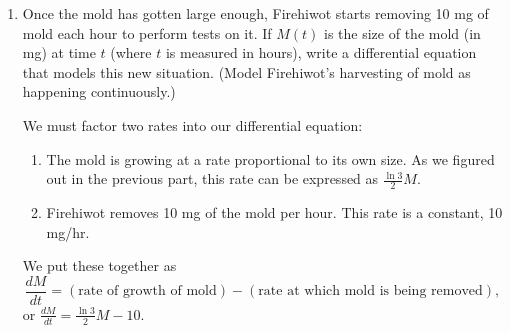\documentclass{article}
\begin{document}
\begin{enumerate}
\begin{enumerate}
\begin{enumerate}
      \begin{solution}
        Since the mold naturally grows at a rate proportional to its own
        size, we know that $\frac{dM}{dt} = kM$.  However, we are told
        that our differential equation should not include any unknown
        constants, so we need to find a value for $k$.

        We are told that the mold grows to three times its original size
        in 2 hours; that is, $M(2) = 3 M(0)$.  To use this, we need a
        formula for $M(t)$; fortunately, we know that the solution of our
        differential equation $\frac{dM}{dt} = kM$ is $M(t) = C e^{kt}$.
        Using this, our equation
        \begin{align*}
          M(2) &= 3 M(0) \\
          \shortintertext{can be rewritten as}
          C e^{2k} &= 3 C \\
          e^{2k} &= 3 \\
          \shortintertext{And now we can solve for $k$:}
          2k &= \ln 3 \\
          k &= \frac{\ln 3}{2}
        \end{align*}
        So, the differential equation we want is $\boxed{ \frac{dM}{dt} =
          \frac{\ln 3}{2} M}$. 
      \end{solution}

    \item
      \begin{problem}[\vfill]
        Once the mold has gotten large enough, Firehiwot starts removing
        10 mg of mold each hour to perform tests on it.  If $M(t)$ is the
        size of the mold (in mg) at time $t$ (where $t$ is measured in
        hours), write a differential equation that models this new
        situation.  (Model Firehiwot's harvesting of mold as happening
        continuously.) 
      \end{problem}

      \begin{solution}
        We must factor two rates into our differential equation:
        \begin{enumerate}[label=\arabic*.]
        \item The mold is growing at a rate proportional to its own size.
          As we figured out in the previous part, this rate can be
          expressed as $\frac{\ln 3}{2} M$.
        \item Firehiwot removes 10 mg of the mold per hour.  This rate is
          a constant, 10 mg/hr. 
        \end{enumerate}
        We put these together as
        \[ \frac{dM}{dt} = (\text{rate of growth of mold}) - (\text{rate
          at which mold is being removed}),\] or $\boxed{ \frac{dM}{dt} =
          \frac{\ln 3}{2} M - 10}$.
      \end{solution}


\end{enumerate}
\end{enumerate}
\end{enumerate}
\end{document}
